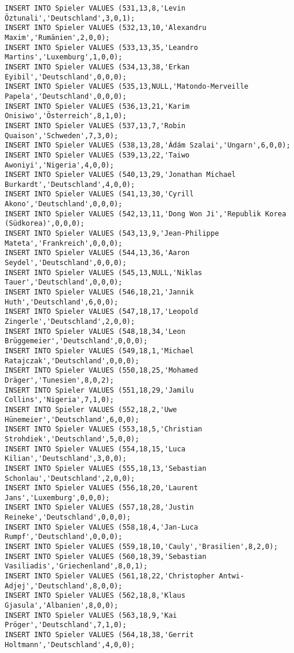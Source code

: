 \documentclass{bschlangaul-aufgabe}
\begin{document}
\begin{verbatim}
INSERT INTO Spieler VALUES (531,13,8,'Levin Öztunali','Deutschland',3,0,1);
INSERT INTO Spieler VALUES (532,13,10,'Alexandru Maxim','Rumänien',2,0,0);
INSERT INTO Spieler VALUES (533,13,35,'Leandro Martins','Luxemburg',1,0,0);
INSERT INTO Spieler VALUES (534,13,38,'Erkan Eyibil','Deutschland',0,0,0);
INSERT INTO Spieler VALUES (535,13,NULL,'Matondo-Merveille Papela','Deutschland',0,0,0);
INSERT INTO Spieler VALUES (536,13,21,'Karim Onisiwo','Österreich',8,1,0);
INSERT INTO Spieler VALUES (537,13,7,'Robin Quaison','Schweden',7,3,0);
INSERT INTO Spieler VALUES (538,13,28,'Ádám Szalai','Ungarn',6,0,0);
INSERT INTO Spieler VALUES (539,13,22,'Taiwo Awoniyi','Nigeria',4,0,0);
INSERT INTO Spieler VALUES (540,13,29,'Jonathan Michael Burkardt','Deutschland',4,0,0);
INSERT INTO Spieler VALUES (541,13,30,'Cyrill Akono','Deutschland',0,0,0);
INSERT INTO Spieler VALUES (542,13,11,'Dong Won Ji','Republik Korea (Südkorea)',0,0,0);
INSERT INTO Spieler VALUES (543,13,9,'Jean-Philippe Mateta','Frankreich',0,0,0);
INSERT INTO Spieler VALUES (544,13,36,'Aaron Seydel','Deutschland',0,0,0);
INSERT INTO Spieler VALUES (545,13,NULL,'Niklas Tauer','Deutschland',0,0,0);
INSERT INTO Spieler VALUES (546,18,21,'Jannik Huth','Deutschland',6,0,0);
INSERT INTO Spieler VALUES (547,18,17,'Leopold Zingerle','Deutschland',2,0,0);
INSERT INTO Spieler VALUES (548,18,34,'Leon Brüggemeier','Deutschland',0,0,0);
INSERT INTO Spieler VALUES (549,18,1,'Michael Ratajczak','Deutschland',0,0,0);
INSERT INTO Spieler VALUES (550,18,25,'Mohamed Dräger','Tunesien',8,0,2);
INSERT INTO Spieler VALUES (551,18,29,'Jamilu Collins','Nigeria',7,1,0);
INSERT INTO Spieler VALUES (552,18,2,'Uwe Hünemeier','Deutschland',6,0,0);
INSERT INTO Spieler VALUES (553,18,5,'Christian Strohdiek','Deutschland',5,0,0);
INSERT INTO Spieler VALUES (554,18,15,'Luca Kilian','Deutschland',3,0,0);
INSERT INTO Spieler VALUES (555,18,13,'Sebastian Schonlau','Deutschland',2,0,0);
INSERT INTO Spieler VALUES (556,18,20,'Laurent Jans','Luxemburg',0,0,0);
INSERT INTO Spieler VALUES (557,18,28,'Justin Reineke','Deutschland',0,0,0);
INSERT INTO Spieler VALUES (558,18,4,'Jan-Luca Rumpf','Deutschland',0,0,0);
INSERT INTO Spieler VALUES (559,18,10,'Cauly','Brasilien',8,2,0);
INSERT INTO Spieler VALUES (560,18,39,'Sebastian Vasiliadis','Griechenland',8,0,1);
INSERT INTO Spieler VALUES (561,18,22,'Christopher Antwi-Adjej','Deutschland',8,0,0);
INSERT INTO Spieler VALUES (562,18,8,'Klaus Gjasula','Albanien',8,0,0);
INSERT INTO Spieler VALUES (563,18,9,'Kai Pröger','Deutschland',7,1,0);
INSERT INTO Spieler VALUES (564,18,38,'Gerrit Holtmann','Deutschland',4,0,0);

\end{verbatim}
\end{document}

